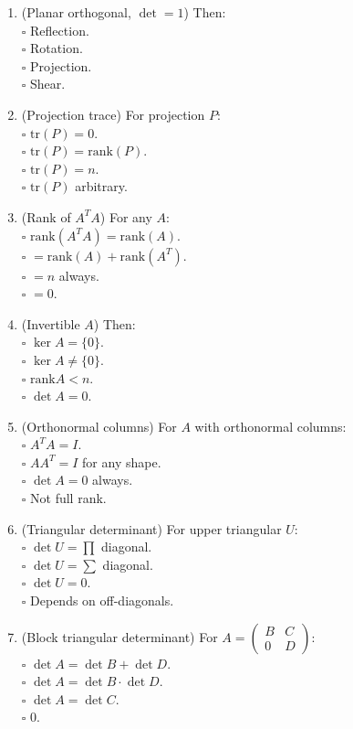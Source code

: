 \documentclass[11pt]{article}
\theoremstyle{upright}
\begin{document}
\begin{enumerate}
\item (Planar orthogonal, $\det=1$) Then:\\
\(\square\) Reflection.\\
\(\square\) Rotation.\\
\(\square\) Projection.\\
\(\square\) Shear.

\item (Projection trace) For projection $P$:\\
\(\square\) $\mathrm{tr}(P)=0$.\\
\(\square\) $\mathrm{tr}(P)=\mathrm{rank}(P)$.\\
\(\square\) $\mathrm{tr}(P)=n$.\\
\(\square\) $\mathrm{tr}(P)$ arbitrary.

\item (Rank of $A^TA$) For any $A$:\\
\(\square\) $\mathrm{rank}(A^TA)=\mathrm{rank}(A)$.\\
\(\square\) $=\mathrm{rank}(A)+\mathrm{rank}(A^T)$.\\
\(\square\) $=n$ always.\\
\(\square\) $=0$.

\item (Invertible $A$) Then:\\
\(\square\) $\ker A=\{0\}$.\\
\(\square\) $\ker A\neq\{0\}$.\\
\(\square\) $\mathrm{rank}A<n$.\\
\(\square\) $\det A=0$.

\item (Orthonormal columns) For $A$ with orthonormal columns:\\
\(\square\) $A^TA=I$.\\
\(\square\) $AA^T=I$ for any shape.\\
\(\square\) $\det A=0$ always.\\
\(\square\) Not full rank.

\item (Triangular determinant) For upper triangular $U$:\\
\(\square\) $\det U = \prod$ diagonal.\\
\(\square\) $\det U = \sum$ diagonal.\\
\(\square\) $\det U = 0$.\\
\(\square\) Depends on off-diagonals.

\item (Block triangular determinant) For $A=\begin{pmatrix}B&C\\0&D\end{pmatrix}$:\\
\(\square\) $\det A=\det B+\det D$.\\
\(\square\) $\det A=\det B\cdot\det D$.\\
\(\square\) $\det A=\det C$.\\
\(\square\) $0$.


\end{enumerate}
\end{document}
